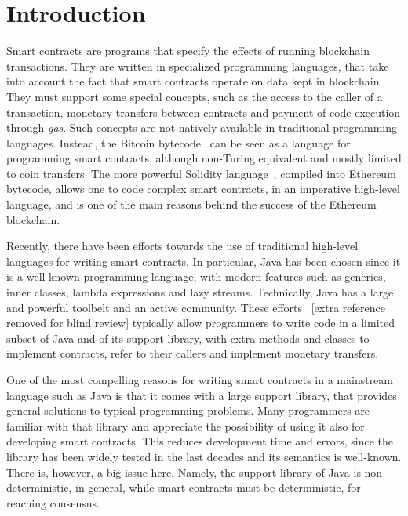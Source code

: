 \section{Introduction}\label{sec:introduction}

Smart contracts are programs that specify the effects of running blockchain transactions.
They are written in specialized programming languages, that take into account
the fact that smart contracts operate on data kept in blockchain. They must
support some special concepts, such as the access to the caller of a transaction,
monetary transfers between contracts
and payment of code execution through \emph{gas}.
Such concepts are not natively available
in traditional programming languages.
Instead, the Bitcoin bytecode~\cite{Antonopoulos17,Nakamoto08}
can be seen as a language for programming smart contracts,
although non-Turing equivalent and mostly limited to coin transfers. The more
powerful Solidity language~\cite{AntonopoulosW18},
compiled into Ethereum bytecode, allows one to code
complex smart contracts, in an imperative high-level language, and is
one of the main reasons behind the success of the Ethereum blockchain.

Recently, there have been efforts towards the use of traditional
high-level languages for writing smart contracts. In particular, Java has
been chosen since it is a well-known programming language,
with modern features such as generics, inner classes, lambda
expressions and lazy streams. Technically, Java has
a large and powerful toolbelt and an active community.
These efforts~\cite{aion,aion_example_contract,neo,neo_contract}
[extra reference removed for blind review]
typically allow programmers to write code in a limited subset of Java
and of its support library,
with extra methods and classes to implement contracts, refer to their
callers and implement monetary transfers.

One of the most compelling reasons for writing smart contracts
in a mainstream language such as Java is that it comes with a large
support library, that provides general solutions to typical programming problems.
Many programmers are familiar with that library and appreciate the possibility
of using it also for developing smart contracts. This reduces
development time and errors, since the library has been widely tested
in the last decades and its semantics is well-known. There is, however, a big
issue here. Namely, the support library of Java is non-deterministic, in general,
while smart contracts must be deterministic, for reaching consensus.

